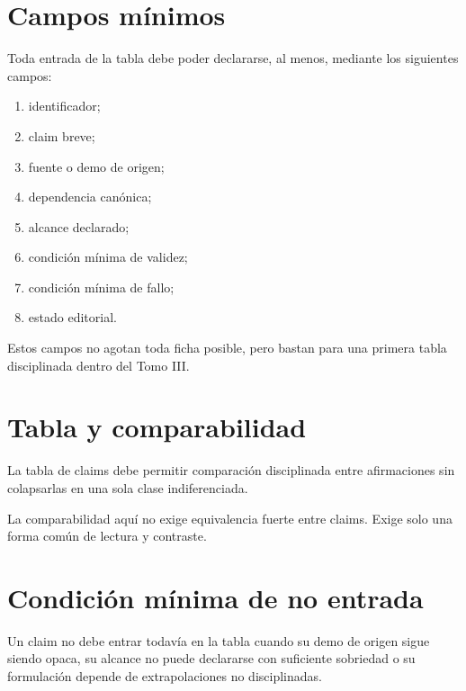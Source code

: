 \section{Campos mínimos}
\begin{definition}
Toda entrada de la tabla debe poder declararse, al menos, mediante los siguientes campos:
\begin{enumerate}
  \item identificador;
  \item claim breve;
  \item fuente o demo de origen;
  \item dependencia canónica;
  \item alcance declarado;
  \item condición mínima de validez;
  \item condición mínima de fallo;
  \item estado editorial.
\end{enumerate}
\end{definition}

\begin{observation}
Estos campos no agotan toda ficha posible, pero bastan para una primera tabla disciplinada dentro del Tomo III.
\end{observation}

\section{Tabla y comparabilidad}
\begin{definition}
La tabla de claims debe permitir comparación disciplinada entre afirmaciones sin colapsarlas en una sola clase indiferenciada.
\end{definition}

\begin{observation}
La comparabilidad aquí no exige equivalencia fuerte entre claims. Exige solo una forma común de lectura y contraste.
\end{observation}

\section{Condición mínima de no entrada}
\begin{definition}
Un claim no debe entrar todavía en la tabla cuando su demo de origen sigue siendo opaca, su alcance no puede declararse con suficiente sobriedad o su formulación depende de extrapolaciones no disciplinadas.
\end{definition}

